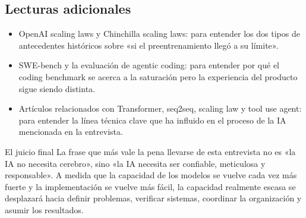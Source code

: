 \documentclass[a4paper]{article}
\begin{document}
\subsection{Lecturas adicionales}

\begin{itemize}
\item OpenAI scaling laws y Chinchilla scaling laws: para entender los dos tipos de antecedentes históricos sobre «si el preentrenamiento llegó a su límite».
\item SWE-bench y la evaluación de agentic coding: para entender por qué el coding benchmark se acerca a la saturación pero la experiencia del producto sigue siendo distinta.
\item Artículos relacionados con Transformer, seq2seq, scaling law y tool use agent: para entender la línea técnica clave que ha influido en el proceso de la IA mencionada en la entrevista.
\end{itemize}

\begin{importantbox}{El juicio final}
La frase que más vale la pena llevarse de esta entrevista no es «la IA no necesita cerebro», sino «la IA necesita ser confiable, meticulosa y responsable». A medida que la capacidad de los modelos se vuelve cada vez más fuerte y la implementación se vuelve más fácil, la capacidad realmente escasa se desplazará hacia definir problemas, verificar sistemas, coordinar la organización y asumir los resultados.
\end{importantbox}
\end{document}
